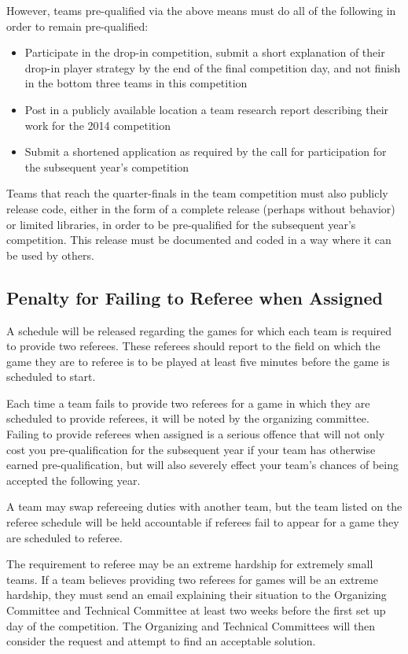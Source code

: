 \documentclass[12pt]{article}
\begin{document}
However, teams pre-qualified via the above means must do all of the following in order to remain pre-qualified:
\begin{itemize}
\item Participate in the drop-in competition, submit a short explanation of their drop-in player strategy by the end of the final competition day, and not finish in the bottom three teams in this competition
\item Post in a publicly available location a team research report describing their work for the 2014 competition
\item Submit a shortened application as required by the call for participation for the subsequent year's competition
\end{itemize}

Teams that reach the quarter-finals in the team competition must also publicly release code, either in the form of a complete release (perhaps without behavior) or limited libraries, in order to be pre-qualified for the subsequent year's competition.  This release must be documented and coded in a way where it can be used by others.

\subsection{Penalty for Failing to Referee when Assigned}
\label{sec:refPenalty}
A schedule will be released regarding the games for which each team is required to provide two referees.  These referees should report to the field on which the game they are to referee is to be played at least five minutes before the game is scheduled to start.

Each time a team fails to provide two referees for a game in which they are scheduled to provide referees, it will be noted by the organizing committee.  Failing to provide referees when assigned is a serious offence that will not only cost you pre-qualification for the subsequent year if your team has otherwise earned pre-qualification, but will also severely effect your team's chances of being accepted the following year.

A team may swap refereeing duties with another team, but the team listed on the referee schedule will be held accountable if referees fail to appear for a game they are scheduled to referee.

The requirement to referee may be an extreme hardship for extremely small teams.  If a team believes providing two referees for games will be an extreme hardship, they must send an email explaining their situation to the Organizing Committee and Technical Committee at least two weeks before the first set up day of the competition.  The Organizing and Technical Committees will then consider the request and attempt to find an acceptable solution.
\end{document}
